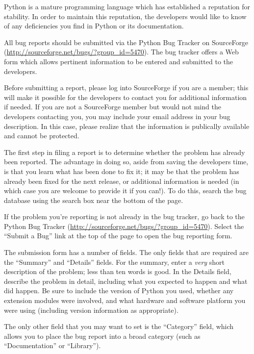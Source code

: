 \label{reporting-bugs}

Python is a mature programming language which has established a
reputation for stability.  In order to maintain this reputation, the
developers would like to know of any deficiencies you find in Python
or its documentation.

All bug reports should be submitted via the Python Bug Tracker on
SourceForge (\url{http://sourceforge.net/bugs/?group_id=5470}).  The
bug tracker offers a Web form which allows pertinent information to be
entered and submitted to the developers.

Before submitting a report, please log into SourceForge if you are a
member; this will make it possible for the developers to contact you
for additional information if needed.  If you are not a SourceForge
member but would not mind the developers contacting you, you may
include your email address in your bug description.  In this case,
please realize that the information is publically available and cannot
be protected.

The first step in filing a report is to determine whether the problem
has already been reported.  The advantage in doing so, aside from
saving the developers time, is that you learn what has been done to
fix it; it may be that the problem has already been fixed for the next
release, or additional information is needed (in which case you are
welcome to provide it if you can!).  To do this, search the bug
database using the search box near the bottom of the page.

If the problem you're reporting is not already in the bug tracker, go
back to the Python Bug Tracker
(\url{http://sourceforge.net/bugs/?group_id=5470}).  Select the
``Submit a Bug'' link at the top of the page to open the bug reporting
form.

The submission form has a number of fields.  The only fields that are
required are the ``Summary'' and ``Details'' fields.  For the summary,
enter a \emph{very} short description of the problem; less than ten
words is good.  In the Details field, describe the problem in detail,
including what you expected to happen and what did happen.  Be sure to
include the version of Python you used, whether any extension modules
were involved, and what hardware and software platform you were using
(including version information as appropriate).

The only other field that you may want to set is the ``Category''
field, which allows you to place the bug report into a broad category
(such as ``Documentation'' or ``Library'').

